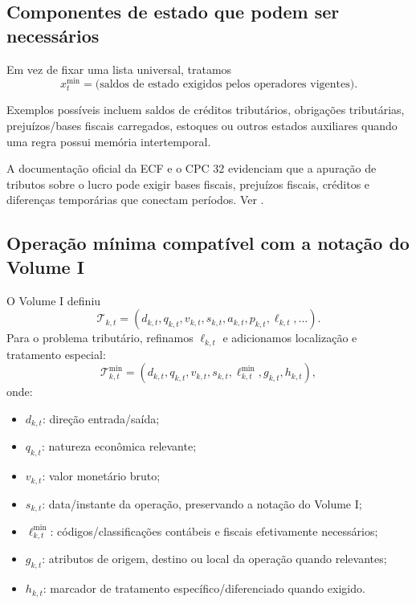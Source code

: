 \documentclass[11pt,a4paper]{article}
\newcommand{\cT}{\mathcal{T}}
\begin{document}
\subsection{Componentes de estado que podem ser necessários}

Em vez de fixar uma lista universal, tratamos
\begin{equation}
 x_t^{\min}
 =\bigl(
 \text{saldos de estado exigidos pelos operadores vigentes}
 \bigr).
\end{equation}

Exemplos possíveis incluem saldos de créditos tributários, obrigações tributárias, prejuízos/bases fiscais carregados, estoques ou outros estados auxiliares quando uma regra possui memória intertemporal.

\begin{fonte}
A documentação oficial da ECF e o CPC 32 evidenciam que a apuração de tributos sobre o lucro pode exigir bases fiscais, prejuízos fiscais, créditos e diferenças temporárias que conectam períodos. Ver \cite{RFB_ECF_2026,CPC32}.
\end{fonte}

\subsection{Operação mínima compatível com a notação do Volume I}

O Volume I definiu
\[
\cT_{k,t}=(d_{k,t},q_{k,t},v_{k,t},s_{k,t},a_{k,t},p_{k,t},\ell_{k,t},\ldots).
\]
Para o problema tributário, refinamos $\ell_{k,t}$ e adicionamos localização e tratamento especial:
\begin{equation}
\boxed{
\cT_{k,t}^{\min}=
(d_{k,t},q_{k,t},v_{k,t},s_{k,t},\ell_{k,t}^{\min},g_{k,t},h_{k,t}),
}
\label{eq:tmin}
\end{equation}
onde:
\begin{itemize}
  \item $d_{k,t}$: direção entrada/saída;
  \item $q_{k,t}$: natureza econômica relevante;
  \item $v_{k,t}$: valor monetário bruto;
  \item $s_{k,t}$: data/instante da operação, preservando a notação do Volume I;
  \item $\ell_{k,t}^{\min}$: códigos/classificações contábeis e fiscais efetivamente necessários;
  \item $g_{k,t}$: atributos de origem, destino ou local da operação quando relevantes;
  \item $h_{k,t}$: marcador de tratamento específico/diferenciado quando exigido.
\end{itemize}
\end{document}
